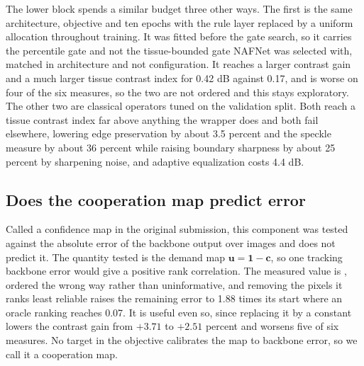 The lower block spends a similar budget three other ways. The first is the same architecture,
objective and ten epochs with the rule layer replaced by a uniform allocation throughout training. It
was fitted before the gate search, so it carries the percentile gate and not the tissue-bounded gate
NAFNet was selected with, matched in architecture and not configuration. It reaches a larger contrast
gain and a much larger tissue contrast index for 0.42 dB against 0.17, and is worse on four of the
six measures, so the two are not ordered and this stays exploratory. The other two are classical
operators tuned on the validation split. Both reach a tissue contrast index far above anything the wrapper
does and both fail elsewhere, lowering edge preservation by about 3.5 percent and the speckle measure
by about 36 percent while raising boundary sharpness by about 25 percent by sharpening noise, and
adaptive equalization costs 4.4 dB.

\subsection{Does the cooperation map predict error}
\label{sec:confidence_check}
Called a confidence map in the original submission, this component was tested against the absolute
error of the backbone output over \NImages{} images and does not predict it. The quantity tested is
the demand map $\mathbf{u} = \mathbf{1} - \mathbf{c}$, so one tracking backbone error would give a
positive rank correlation. The measured value is \CalibRho{}, ordered the wrong way rather than
uninformative, and removing the pixels it ranks least reliable raises the remaining error to 1.88
times its start where an oracle ranking reaches 0.07. It is useful even so, since replacing it by a constant lowers
the contrast gain from $+3.71$ to $+2.51$ percent and worsens five of six measures. No target in the
objective calibrates the map to backbone error, so we call it a cooperation map.

\begin{table}[!tb]
\centering
\caption{The seed 0 checkpoint of the selected NAFNet model on the same 173 test images, not a mean
over seeds. Above, one component of the wrapper removed at a time. Below, three other ways of
spending a similar budget on the same backbone output. Columns as in Table~\ref{tab:pku37}.}
\label{tab:components}
\setlength{\tabcolsep}{4pt}
\scriptsize
\setlength{\aboverulesep}{0pt}
\setlength{\belowrulesep}{0pt}
\renewcommand{\arraystretch}{0.95}

\end{table}

